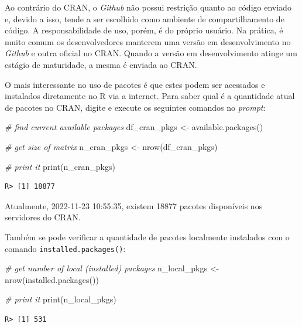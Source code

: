 \documentclass[
  11pt,
]{book}
\newenvironment{Shaded}{\begin{snugshade}}{\end{snugshade}}
\newcommand{\CommentTok}[1]{\textcolor[rgb]{0.37,0.37,0.37}{\textit{#1}}}
\newcommand{\FunctionTok}[1]{\textcolor[rgb]{0,0,0}{#1}}
\newcommand{\NormalTok}[1]{#1}
\newcommand{\OtherTok}[1]{\textcolor[rgb]{0.37,0.37,0.37}{#1}}
\begin{document}
Ao contrário do CRAN, o \emph{Github} não possui restrição quanto ao código enviado e, devido a isso, tende a ser escolhido como ambiente de compartilhamento de código. A responsabilidade de uso, porém, é do próprio usuário. Na prática, é muito comum os desenvolvedores manterem uma versão em desenvolvimento no \emph{Github} e outra oficial no CRAN. Quando a versão em desenvolvimento atinge um estágio de maturidade, a mesma é enviada ao CRAN.

O mais interessante no uso de pacotes é que estes podem ser acessados e instalados diretamente no R via a internet. Para saber qual é a quantidade atual de pacotes no CRAN, digite e execute os seguintes comandos no \emph{prompt}:

\begin{Shaded}
\begin{Highlighting}[]
\CommentTok{\# find current available packages}
\NormalTok{df\_cran\_pkgs }\OtherTok{\textless{}{-}} \FunctionTok{available.packages}\NormalTok{()}

\CommentTok{\# get size of matrix}
\NormalTok{n\_cran\_pkgs }\OtherTok{\textless{}{-}} \FunctionTok{nrow}\NormalTok{(df\_cran\_pkgs)}

\CommentTok{\# print it}
\FunctionTok{print}\NormalTok{(n\_cran\_pkgs)}
\end{Highlighting}
\end{Shaded}

\begin{verbatim}
R> [1] 18877
\end{verbatim}

Atualmente, 2022-11-23 10:55:35, existem 18877 pacotes disponíveis nos servidores do CRAN.

Também se pode verificar a quantidade de pacotes localmente instalados com o comando \texttt{installed.packages()}:

\begin{Shaded}
\begin{Highlighting}[]
\CommentTok{\# get number of local (installed) packages}
\NormalTok{n\_local\_pkgs }\OtherTok{\textless{}{-}} \FunctionTok{nrow}\NormalTok{(}\FunctionTok{installed.packages}\NormalTok{())}

\CommentTok{\# print it}
\FunctionTok{print}\NormalTok{(n\_local\_pkgs)}
\end{Highlighting}
\end{Shaded}

\begin{verbatim}
R> [1] 531
\end{verbatim}
\end{document}
